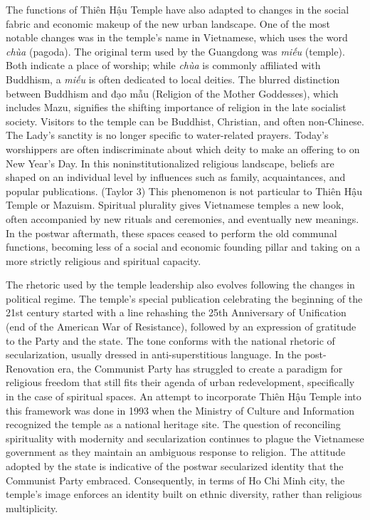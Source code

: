 The functions of Thiên Hậu Temple have also adapted to changes in the social fabric and economic makeup of the new urban landscape. One of the most notable changes was in the temple's name in Vietnamese, which uses the word \textit{chùa} (pagoda). The original term used by the Guangdong was \textit{miếu} (temple). Both indicate a place of worship; while \textit{chùa} is commonly affiliated with Buddhism, a \textit{miếu} is often dedicated to local deities. The blurred distinction between Buddhism and đạo mẫu (Religion of the Mother Goddesses), which includes Mazu, signifies the shifting importance of religion in the late socialist society. Visitors to the temple can be Buddhist, Christian, and often non-Chinese. The Lady’s sanctity is no longer specific to water-related prayers. Today’s worshippers are often indiscriminate about which deity to make an offering to on New Year’s Day. In this noninstitutionalized religious landscape, beliefs are shaped on an individual level by influences such as family, acquaintances, and popular publications. (Taylor 3) This phenomenon is not particular to Thiên Hậu Temple or Mazuism. Spiritual plurality gives Vietnamese temples a new look, often accompanied by new rituals and ceremonies, and eventually new meanings. In the postwar aftermath, these spaces ceased to perform the old communal functions, becoming less of a social and economic founding pillar and taking on a more strictly religious and spiritual capacity.

The rhetoric used by the temple leadership also evolves following the changes in political regime. The temple's special publication celebrating the beginning of the 21st century started with a line rehashing the 25th Anniversary of Unification (end of the American War of Resistance), followed by an expression of gratitude to the Party and the state.  The tone conforms with the national rhetoric of secularization, usually dressed in anti-superstitious language. In the post-Renovation era, the Communist Party has struggled to create a paradigm for religious freedom that still fits their agenda of urban redevelopment, specifically in the case of spiritual spaces.  An attempt to incorporate Thiên Hậu Temple into this framework was done in 1993 when the Ministry of Culture and Information recognized the temple as a national heritage site. The question of reconciling spirituality with modernity and secularization continues to plague the Vietnamese government as they maintain an ambiguous response to religion. The attitude adopted by the state is indicative of the postwar secularized identity that the Communist Party embraced. Consequently, in terms of Ho Chi Minh city, the temple's image enforces an identity built on ethnic diversity, rather than religious multiplicity. 

